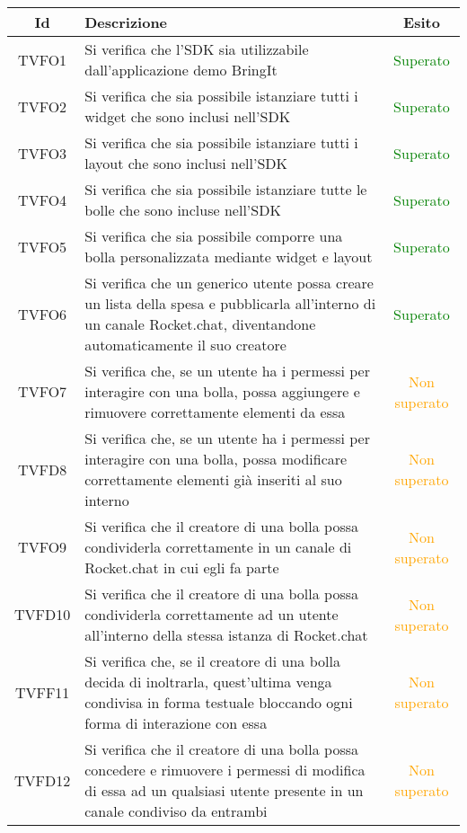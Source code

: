 \begin{center}
	\begin{longtable}{|c|>{\centering}m{10cm}|c|}\hline
		Id & Descrizione & Esito\\ \hline
		TVFO1 & Si verifica che l'SDK sia utilizzabile dall'applicazione demo BringIt & \textcolor{Green}{Superato}\\ \hline
		TVFO2 & Si verifica che sia possibile istanziare tutti i widget che sono inclusi nell'SDK & \textcolor{Green}{Superato}\\ \hline
		TVFO3 & Si verifica che sia possibile istanziare tutti i layout che sono inclusi nell'SDK & \textcolor{Green}{Superato}\\ \hline
		TVFO4 & Si verifica che sia possibile istanziare tutte le bolle che sono incluse nell'SDK & \textcolor{Green}{Superato}\\ \hline
		TVFO5 & Si verifica che sia possibile comporre una bolla personalizzata mediante widget e layout & \textcolor{Green}{Superato}\\ \hline
		TVFO6 & Si verifica che un generico utente possa creare un lista della spesa e pubblicarla all'interno di un canale Rocket.chat, diventandone automaticamente il suo creatore & \textcolor{Green}{Superato}\\ \hline
		TVFO7 & Si verifica che, se un utente ha i permessi per interagire con una bolla, possa aggiungere e rimuovere correttamente elementi da essa & \textcolor{Orange}{Non superato}\\ \hline
		TVFD8 & Si verifica che, se un utente ha i permessi per interagire con una bolla, possa modificare correttamente elementi già inseriti al suo interno & \textcolor{Orange}{Non superato}\\ \hline
		TVFO9 & Si verifica che il creatore di una bolla possa condividerla correttamente in un canale di Rocket.chat in cui egli fa parte & \textcolor{Orange}{Non superato}\\ \hline
		TVFD10 & Si verifica che il creatore di una bolla possa condividerla correttamente ad un utente all'interno della stessa istanza di Rocket.chat & \textcolor{Orange}{Non superato}\\ \hline
		TVFF11 & Si verifica che, se il creatore di una bolla decida di inoltrarla, quest'ultima venga condivisa in forma testuale bloccando ogni forma di interazione con essa & \textcolor{Orange}{Non superato}\\ \hline
		TVFD12 & Si verifica che il creatore di una bolla possa concedere e rimuovere i permessi di modifica di essa ad un qualsiasi utente presente in un canale condiviso da entrambi & \textcolor{Orange}{Non superato}\\ \hline

\end{longtable}
\end{center}
